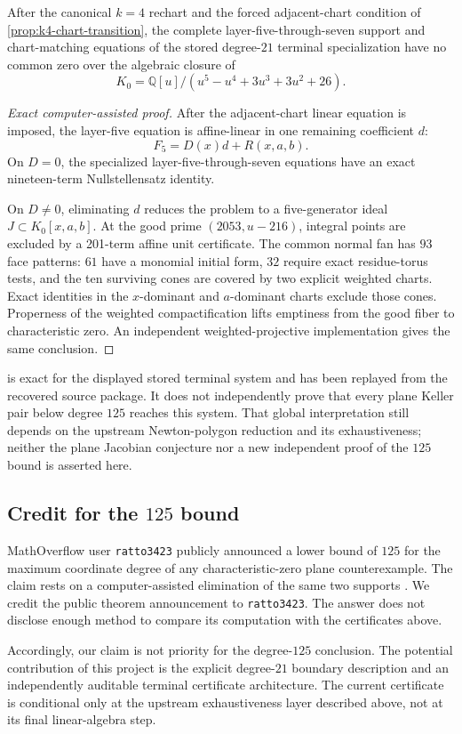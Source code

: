 \begin{theorem}
\label{thm:stored-terminal-layer-seven}
After the canonical \(k=4\) rechart and the forced adjacent-chart
condition of \cref{prop:k4-chart-transition}, the complete
layer-five-through-seven support and chart-matching equations of the stored
degree-\(21\) terminal specialization have no common zero over the
algebraic closure of
\[
K_0=\mathbb Q[u]/(u^5-u^4+3u^3+3u^2+26).
\]
\end{theorem}

\begin{proof}[Exact computer-assisted proof]
After the adjacent-chart linear equation is imposed, the layer-five
equation is affine-linear in one remaining coefficient \(d\):
\[
F_5=D(x)d+R(x,a,b).
\]
On \(D=0\), the specialized layer-five-through-seven equations have an
exact nineteen-term Nullstellensatz identity.

On \(D\ne0\), eliminating \(d\) reduces the problem to a five-generator
ideal \(J\subset K_0[x,a,b]\).  At the good prime
\((2053,u-216)\), integral points are excluded by a 201-term affine unit
certificate.  The common normal fan has \(93\) face patterns: \(61\) have a
monomial initial form, \(32\) require exact residue-torus tests, and the ten
surviving cones are covered by two explicit weighted charts.  Exact
identities in the \(x\)-dominant and \(a\)-dominant charts exclude those
cones.  Properness of the weighted compactification lifts emptiness from the
good fiber to characteristic zero.  An independent weighted-projective
implementation gives the same conclusion.
\end{proof}

 is exact for the displayed stored
terminal system and has been replayed from the recovered source package.
It does not independently prove that every plane Keller pair below degree
\(125\) reaches this system.  That global interpretation still depends on
the upstream Newton-polygon reduction and its exhaustiveness; neither the
plane Jacobian conjecture nor a new independent proof of the \(125\) bound
is asserted here.

\subsection{Credit for the \texorpdfstring{\(125\)}{125} bound}

MathOverflow user \texttt{ratto3423} publicly announced a lower bound of
\(125\) for the maximum coordinate degree of any characteristic-zero plane
counterexample.  The claim rests on a computer-assisted elimination of the
same two supports \cite{ratto3423degree125}.  We credit the public theorem
announcement to \texttt{ratto3423}.  The answer does not disclose enough
method to compare its computation with the certificates above.

Accordingly, our claim is not priority for the degree-\(125\) conclusion.
The potential contribution of this project is the explicit degree-\(21\)
boundary description and an independently auditable terminal certificate
architecture.  The current certificate is conditional only at the upstream
exhaustiveness layer described above, not at its final linear-algebra step.
